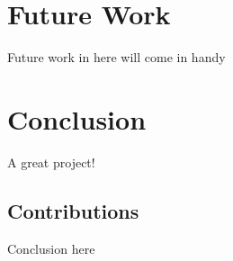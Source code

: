\documentclass{l3proj}
\begin{document}
\chapter{Future Work}
\label{Future Work}

Future work in here will come in handy

\chapter{Conclusion}

A great project!

\section{Contributions}

Conclusion here



\end{document}
